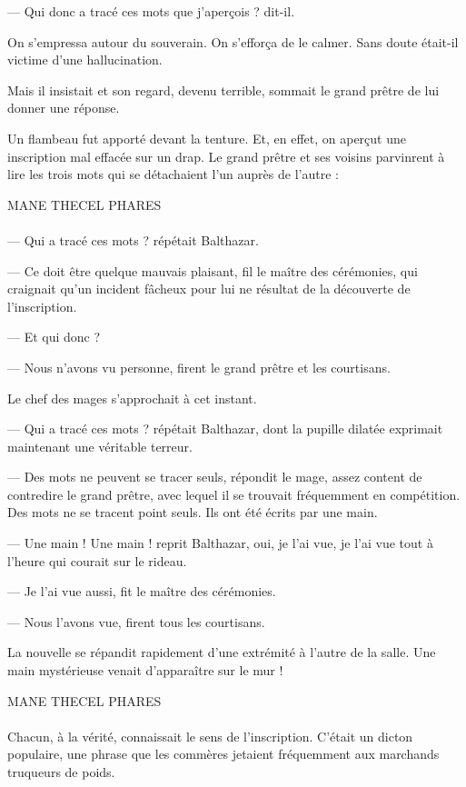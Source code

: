 \documentclass[a4paper, 11pt, oneside, polutonikogreek, french]{article}
\begin{document}
--- Qui donc a tracé ces mots que j'aperçois ? dit-il.

On s'empressa autour du souverain. On s'efforça de le calmer. Sans doute était-il victime d'une hallucination.

Mais il insistait et son regard, devenu terrible, sommait le grand prêtre de lui donner une réponse.

Un flambeau fut apporté devant la tenture. Et, en effet, on aperçut une inscription mal effacée sur un drap. Le grand prêtre et ses voisins parvinrent à lire les trois mots qui se détachaient l'un auprès de l'autre :

\begin{center}
MANE THECEL PHARES
\end{center}
\paragraph{}
--- Qui a tracé ces mots ? répétait Balthazar.

--- Ce doit être quelque mauvais plaisant, fil le maître des cérémonies, qui craignait qu'un incident fâcheux pour lui ne résultat de la découverte de l'inscription.

--- Et qui donc ?

--- Nous n'avons vu personne, firent le grand prêtre et les courtisans.

Le chef des mages s'approchait à cet instant.

--- Qui a tracé ces mots ? répétait Balthazar, dont la pupille dilatée exprimait maintenant une véritable terreur.

--- Des mots ne peuvent se tracer seuls, répondit le mage, assez content de contredire le grand prêtre, avec lequel il se trouvait fréquemment en compétition. Des mots ne se tracent point seuls. Ils ont été écrits par une main.

--- Une main ! Une main ! reprit Balthazar, oui, je l'ai vue, je l'ai vue tout à l'heure qui courait sur le rideau.

--- Je l'ai vue aussi, fit le maître des cérémonies.

--- Nous l'avons vue, firent tous les courtisans.

La nouvelle se répandit rapidement d'une extrémité à l'autre de la salle. Une main mystérieuse venait d'apparaître sur le mur !

\begin{center}
MANE THECEL PHARES
\end{center}
\paragraph{}
Chacun, à la vérité, connaissait le sens de l'inscription. C'était un dicton populaire, une phrase que les commères jetaient fréquemment aux marchands truqueurs de poids.
\end{document}
